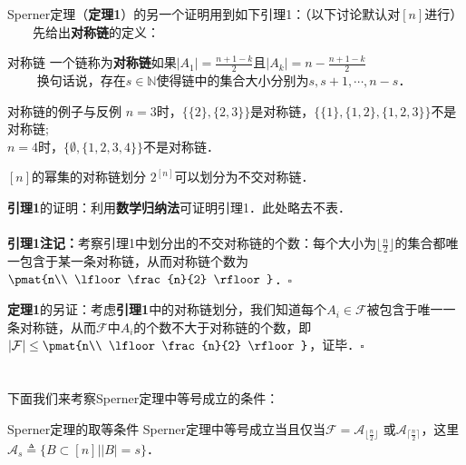 Sperner定理（\textbf{定理1}）的另一个证明用到如下引理1：（以下讨论默认对$[n]$进行）\\
$\qquad$先给出\textbf{对称链}的定义：

\begin{definition}{对称链}
一个链称为\textbf{对称链}如果$|A_1|=\frac{n+1-k}{2}$且$|A_k|=n-\frac{n+1-k}{2}$\\
$\qquad$
换句话说，存在$s\in \mathbb{N}$使得链中的集合大小分别为$s,s+1,\cdots,n-s$．
\end{definition}

\begin{example}{对称链的例子与反例}
$n=3$时，$\{\{2\},\{2,3\}\}$是对称链，$\{\{1\},\{1,2\},\{1,2,3\}\}$不是对称链;\\
$n=4$时，$\{\emptyset,\{1,2,3,4\}\}$不是对称链．
\end{example}


\begin{lemma}{$[n]$的幂集的对称链划分}
$2^{[n]}$可以划分为不交对称链．
\end{lemma}

\textbf{引理1}的证明：利用\textbf{数学归纳法}可证明引理1．此处略去不表．\\\\
\textbf{引理1注记：}考察引理1中划分出的不交对称链的个数：每个大小为$\lfloor\frac{n}{2}\rfloor$的集合都唯一包含于某一条对称链，从而对称链个数为$\pmat{n\\ \lfloor\frac{n}{2} \rfloor}$．$\square$

\textbf{定理1}的另证：考虑\textbf{引理1}中的对称链划分，我们知道每个$A_i\in \mathcal{F}$被包含于唯一一条对称链，从而$\mathcal{F}$中$A_i$的个数不大于对称链的个数，即$|\mathcal{F}|\leq \pmat{n\\ \lfloor\frac{n}{2} \rfloor}$，证毕．$\square$\\
\\
\\
下面我们来考察Sperner定理中等号成立的条件：
\begin{theorem}{Sperner定理的取等条件}
Sperner定理中等号成立当且仅当$\mathcal{F}=\mathcal{A}_{\lfloor\frac{n}{2} \rfloor}$ 或$ \mathcal{A}_{\lceil\frac{n}{2} \rceil}$，这里$\mathcal{A}_s\triangleq\{B\subset[n]||B|=s\}$．
\end{theorem}

